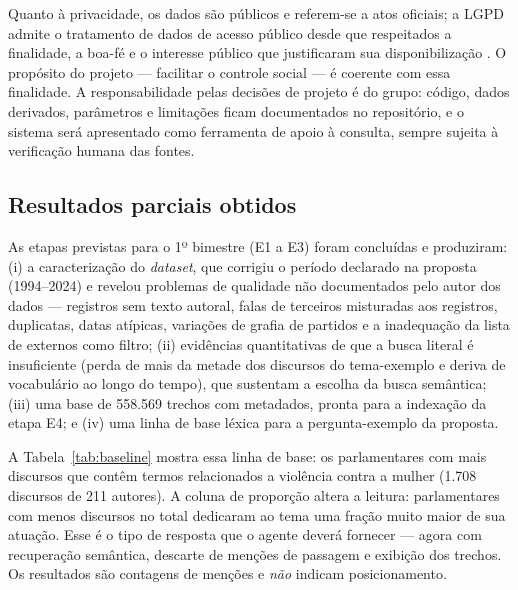\documentclass[12pt]{article}
\begin{document}
Quanto à privacidade, os dados são públicos e referem-se a atos oficiais; a LGPD admite o
tratamento de dados de acesso público desde que respeitados a finalidade, a boa-fé e o interesse
público que justificaram sua disponibilização \cite{brasil2018}. O propósito do projeto ---
facilitar o controle social --- é coerente com essa finalidade. A responsabilidade pelas decisões
de projeto é do grupo: código, dados derivados, parâmetros e limitações ficam documentados no
repositório, e o sistema será apresentado como ferramenta de apoio à consulta, sempre sujeita à
verificação humana das fontes.

\subsection{Resultados parciais obtidos}

As etapas previstas para o 1º bimestre (E1 a E3) foram concluídas e produziram:
(i) a caracterização do \textit{dataset}, que corrigiu o período declarado na proposta
(1994--2024) e revelou problemas de qualidade não documentados pelo autor dos dados --- registros
sem texto autoral, falas de terceiros misturadas aos registros, duplicatas, datas atípicas,
variações de grafia de partidos e a inadequação da lista de externos como filtro;
(ii) evidências quantitativas de que a busca literal é insuficiente (perda de mais da metade dos
discursos do tema-exemplo e deriva de vocabulário ao longo do tempo), que sustentam a escolha da
busca semântica;
(iii) uma base de 558.569 trechos com metadados, pronta para a indexação da etapa E4; e
(iv) uma linha de base léxica para a pergunta-exemplo da proposta.

A Tabela~\ref{tab:baseline} mostra essa linha de base: os parlamentares com mais discursos que
contêm termos relacionados a violência contra a mulher (1.708 discursos de 211 autores). A coluna de
proporção altera a leitura: parlamentares com menos discursos no total dedicaram ao tema uma
fração muito maior de sua atuação. Esse é o tipo de resposta que o agente deverá fornecer ---
agora com recuperação semântica, descarte de menções de passagem e exibição dos trechos. Os
resultados são contagens de menções e \emph{não} indicam posicionamento.
\end{document}
